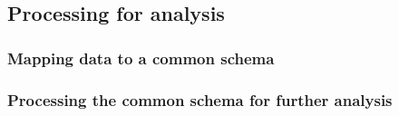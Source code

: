 \subsection{Processing for analysis}

\subsubsection{Mapping data to a common schema}





\subsubsection{Processing the common schema for further analysis}








